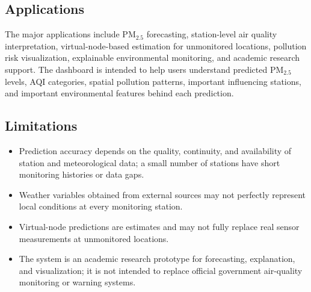\subsection{Applications}


The major applications include PM$_{2.5}$ forecasting, station-level air quality
interpretation, virtual-node-based estimation for unmonitored locations, pollution risk
visualization, explainable environmental monitoring, and academic research support. The
dashboard is intended to help users understand predicted PM$_{2.5}$ levels, AQI categories,
spatial pollution patterns, important influencing stations, and important environmental
features behind each prediction.

\subsection{Limitations}


\begin{itemize}
    \item Prediction accuracy depends on the quality, continuity, and availability of station and meteorological data; a small number of stations have short monitoring histories or data gaps.
    \item Weather variables obtained from external sources may not perfectly represent local conditions at every monitoring station.
    \item Virtual-node predictions are estimates and may not fully replace real sensor measurements at unmonitored locations.
    \item The system is an academic research prototype for forecasting, explanation, and visualization; it is not intended to replace official government air-quality monitoring or warning systems.
\end{itemize}
